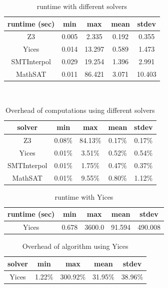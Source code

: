 \begin{table}
  \centering
  \begin{tabular}{ |c||c|c|c|c| }
    \hline
     runtime (sec) & min & max & mean & stdev \\[0.5ex]
    \hline\hline
    Z3   & 0.005 & 2.335 & 0.192 & 0.355 \\[0.5ex]
    Yices &   0.014  & 13.297   & 0.589 & 1.473 \\[0.5ex]
    SMTInterpol& 0.029 & 19.254 &  1.396 & 2.991 \\[0.5ex]
    MathSAT & 0.011 & 86.421 &  3.071 & 10.403 \\[0.5ex]
    \hline
  \end{tabular} \\
  \caption{\ucalg runtime with different solvers}
  \label{tab:runtime-ucalg}
\end{table}

\begin{table}
  \centering
  \begin{tabular}{ |c||c|c|c|c| }
    \hline
     solver & min & max & mean & stdev \\[0.5ex]
    \hline
    Z3   & 0.08\% & 84.13\% & 0.17\% & 0.17\% \\[0.5ex]
    Yices &   0.01\%  & 3.51\%   & 0.52\% & 0.54\% \\[0.5ex]
    SMTInterpol& 0.01\% & 1.75\% &  0.47\% & 0.37\%\\[0.5ex]
    MathSAT &0.01\% & 9.55\% &  0.80\% & 1.12\%\\[0.5ex]
    \hline
  \end{tabular}
  \caption{Overhead of \ucalg computations using different solvers}
  \label{tab:overhead-ucalg}
\end{table}

\begin{table}
  \centering
  \begin{tabular}{ |c||c|c|c|c| }
    \hline
     runtime (sec) & min & max & mean & stdev \\[0.5ex]
    \hline
    Yices &   0.678  & 3600.0   & 91.594 & 490.008 \\[0.5ex]
    \hline
  \end{tabular}
  \caption{\ucbfalg runtime with Yices}
  \label{tab:runtime-ucbfalg}
\end{table}

\begin{table}
  \centering
  \begin{tabular}{ |c||c|c|c|c| }
    \hline
     solver & min & max & mean & stdev \\[0.5ex]
    \hline
    Yices & 1.22\%  & 300.92\%   & 31.95\% & 38.96\% \\[0.5ex]
    \hline
  \end{tabular}
  \caption{Overhead of \ucbfalg algorithm using Yices}
  \label{tab:overhead-ucbfalg}
\end{table}

